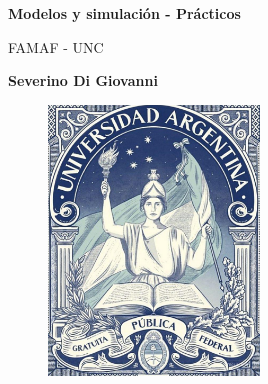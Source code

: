 \documentclass[a4paper, 12pt]{article}
\begin{document}
\begin{titlepage}
   \begin{center}
       \vspace*{1cm}

       \Huge
       \textbf{Modelos y simulación - Prácticos}

       \vspace{0.5cm}
        FAMAF - UNC
            
       \vspace{1.5cm}
       \large
       \textbf{Severino Di Giovanni}
       \normalsize


       \vspace{5.0cm}
       \begin{figure}[h!]
       \centering
        \includegraphics[width=0.5\textwidth]{../Images/UPA.jpg}
       \end{figure}

       \vfill
            
            
     
   \end{center}
\end{titlepage}


\shipout\null
\end{document}
